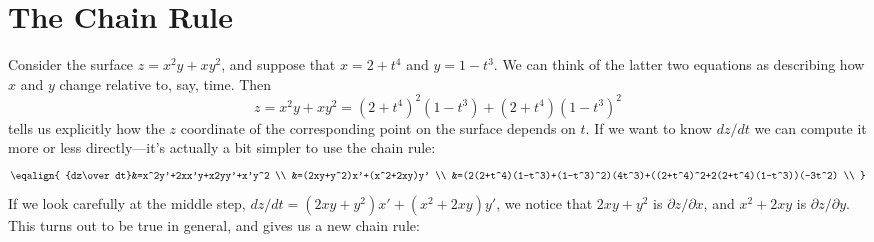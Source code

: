 \section{The Chain Rule}{}{}
\label{sec:multivariable chain rules}
Consider the surface $z=x^2y+xy^2$, and suppose that 
$x=2+t^4$ and $y=1-t^3$. We can think of the latter two equations as
describing how $x$ and $y$ change relative to, say, time. Then
$$z=x^2y+xy^2=(2+t^4)^2(1-t^3)+(2+t^4)(1-t^3)^2$$ 
tells us explicitly how the $z$ coordinate of the corresponding point on the
surface depends on $t$. If we want to know $dz/dt$ we can compute it
more or less directly---it's actually a bit simpler to use the chain
rule:
$$\eqalign{
  {dz\over dt}&=x^2y'+2xx'y+x2yy'+x'y^2 \\
  &=(2xy+y^2)x'+(x^2+2xy)y' \\
  &=(2(2+t^4)(1-t^3)+(1-t^3)^2)(4t^3)+((2+t^4)^2+2(2+t^4)(1-t^3))(-3t^2) \\
}$$ 
If we look carefully at the middle step,
$dz/dt=(2xy+y^2)x'+(x^2+2xy)y'$, we notice that $2xy+y^2$ is $\partial
z/\partial x$, and $x^2+2xy$ is $\partial z/\partial y$.
This turns out to be true in general, and gives us a new chain rule:


